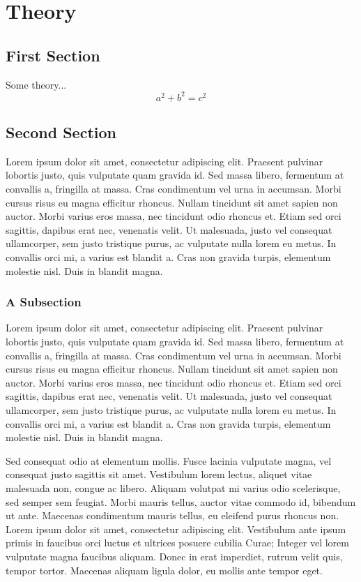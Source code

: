 \chapter{Theory}

\section{First Section}
Some theory... 
\begin{equation}
	a^2 + b^2 = c^2
\end{equation}

\section{Second Section}
Lorem ipsum dolor sit amet, consectetur adipiscing elit. Praesent pulvinar 
lobortis justo, quis vulputate quam gravida id. Sed massa libero, fermentum at 
convallis a, fringilla at massa. Cras condimentum vel urna in accumsan. Morbi 
cursus risus eu magna efficitur rhoncus. Nullam tincidunt sit amet sapien non 
auctor. Morbi varius eros massa, nec tincidunt odio rhoncus et. Etiam sed orci 
sagittis, dapibus erat nec, venenatis velit. Ut malesuada, justo vel consequat 
ullamcorper, sem justo tristique purus, ac vulputate nulla lorem eu metus. In 
convallis orci mi, a varius est blandit a. Cras non gravida turpis, elementum 
molestie nisl. Duis in blandit magna.

\subsection{A Subsection}
Lorem ipsum dolor sit amet, consectetur adipiscing elit. Praesent pulvinar 
lobortis justo, quis vulputate quam gravida id. Sed massa libero, fermentum at 
convallis a, fringilla at massa. Cras condimentum vel urna in accumsan. Morbi 
cursus risus eu magna efficitur rhoncus. Nullam tincidunt sit amet sapien non 
auctor. Morbi varius eros massa, nec tincidunt odio rhoncus et. Etiam sed orci 
sagittis, dapibus erat nec, venenatis velit. Ut malesuada, justo vel consequat 
ullamcorper, sem justo tristique purus, ac vulputate nulla lorem eu metus. In 
convallis orci mi, a varius est blandit a. Cras non gravida turpis, elementum 
molestie nisl. Duis in blandit magna.

Sed consequat odio at elementum mollis. Fusce lacinia vulputate magna, vel 
consequat justo sagittis sit amet. Vestibulum lorem lectus, aliquet vitae 
malesuada non, congue ac libero. Aliquam volutpat mi varius odio scelerisque, 
sed semper sem feugiat. Morbi mauris tellus, auctor vitae commodo id, bibendum 
ut ante. Maecenas condimentum mauris tellus, eu eleifend purus rhoncus non. 
Lorem ipsum dolor sit amet, consectetur adipiscing elit. Vestibulum ante ipsum 
primis in faucibus orci luctus et ultrices posuere cubilia Curae; Integer vel 
lorem vulputate magna faucibus aliquam. Donec in erat imperdiet, rutrum velit 
quis, tempor tortor. Maecenas aliquam ligula dolor, eu mollis ante tempor eget.

